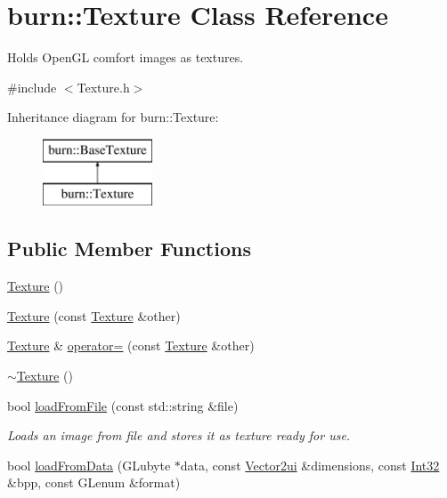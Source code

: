 \hypertarget{classburn_1_1_texture}{\section{burn\-:\-:Texture Class Reference}
\label{classburn_1_1_texture}
}


Holds Open\-G\-L comfort images as textures.  




{\ttfamily \#include $<$Texture.\-h$>$}

Inheritance diagram for burn\-:\-:Texture\-:\begin{figure}[H]
\begin{center}
\leavevmode
\includegraphics[height=2.000000cm]{classburn_1_1_texture}
\end{center}
\end{figure}
\subsection*{Public Member Functions}
\begin{DoxyCompactItemize}
\item 
\hyperlink{classburn_1_1_texture_ac44cabdfa800d3881a78e9bfa6a90a77}{Texture} ()
\item 
\hyperlink{classburn_1_1_texture_a8878f6109bcbfdc3171516f43ed7c3c6}{Texture} (const \hyperlink{classburn_1_1_texture}{Texture} \&other)
\item 
\hyperlink{classburn_1_1_texture}{Texture} \& \hyperlink{classburn_1_1_texture_a54465cf7f59f204405b3ea7e110686af}{operator=} (const \hyperlink{classburn_1_1_texture}{Texture} \&other)
\item 
\hyperlink{classburn_1_1_texture_a2652ca0b245b24ef802bb20a99d8248f}{$\sim$\-Texture} ()
\item 
bool \hyperlink{classburn_1_1_texture_a96d10626c422ea8dbc2cd51105061128}{load\-From\-File} (const std\-::string \&file)
\begin{DoxyCompactList}\small\item\em Loads an image from file and stores it as texture ready for use. \end{DoxyCompactList}\item 
bool \hyperlink{classburn_1_1_texture_a5b0db64283a0b8fb24f332e461019893}{load\-From\-Data} (G\-Lubyte $\ast$data, const \hyperlink{namespaceburn_a6805fa33c49c4c3db88a7bebba2c408f}{Vector2ui} \&dimensions, const \hyperlink{namespaceburn_a96c2e82d6da686c64a6f330628466b05}{Int32} \&bpp, const G\-Lenum \&format)
\end{DoxyCompactItemize}
